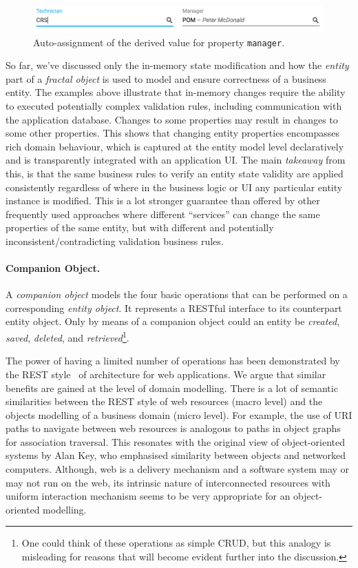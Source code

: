 \documentclass[a4paper,12pt,oneside,openright,final]{memoir} %
\begin{document}
	\begin{figure}[!h]
  		\centering
      	\includegraphics[width=1.0\textwidth]{images/05-wa-technician-entered.png}  
   	  	\caption{Auto-assignment of the derived value for property \texttt{manager}.}
   		\label{fig:derived-manager}
  	\end{figure}
	
	
	So far, we've discussed only the in-memory state modification and how the \emph{entity} part of a \emph{fractal object} is used to model and ensure correctness of a business entity.
	The examples above illustrate that in-memory changes require the ability to executed potentially complex validation rules, including communication with the application database.
	Changes to some properties may result in changes to some other properties.
	This shows that changing entity properties encompasses rich domain behaviour, which is captured at the entity model level declaratively and is transparently integrated with an application UI.
	The main \emph{takeaway} from this, is that the same business rules to verify an entity state validity are applied consistently regardless of where in the business logic or UI any particular entity instance is modified.
	This is a lot stronger guarantee than offered by other frequently used approaches where different ``services'' can change the same properties of the same entity, but with different and potentially inconsistent/contradicting validation business rules.
	
	\paragraph{Companion Object.}	
	A \emph{companion object} models the four basic operations that can be performed on a corresponding \emph{entity object}.
	It represents a RESTful interface to its counterpart entity object.
	Only by means of a companion object could an entity be \emph{created}, \emph{saved}, \emph{deleted}, and \emph{retrieved}\footnote{One could think of these operations as simple CRUD, but this analogy is misleading for reasons that will become evident further into the discussion.}.
	
	The power of having a limited number of operations has been demonstrated by the REST style~\cite{Fielding2000} of architecture for web applications.
	We argue that similar benefits are gained at the level of domain modelling.
  	There is a lot of semantic similarities between the REST style of web resources (macro level) and the objects modelling of a business domain (micro level).
  	For example, the use of URI paths to navigate between web resources is analogous to paths in object graphs for association traversal.
  	This resonates with the original view of object-oriented systems by Alan Key, who emphasised similarity between objects and networked computers.
  	Although, web is a delivery mechanism and a software system may or may not run on the web, its intrinsic nature of interconnected resources with uniform interaction mechanism seems to be very appropriate for an object-oriented modelling.
\end{document}
